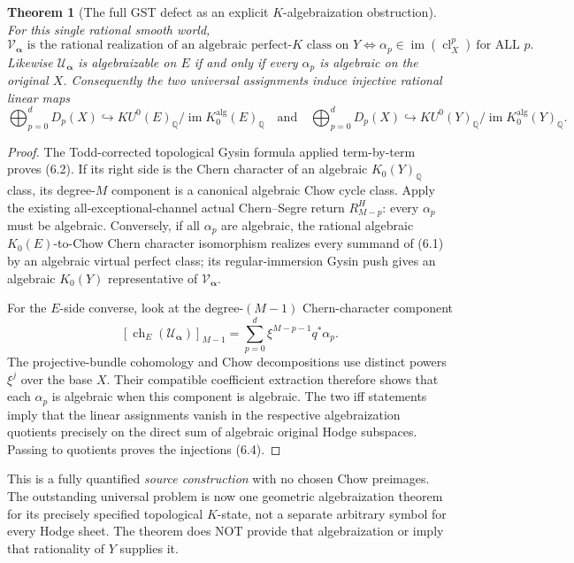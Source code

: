 \documentclass[11pt]{article}
\newcommand{\Q}{\mathbb Q}
\newcommand{\cl}{\operatorname{cl}}
\newcommand{\ch}{\operatorname{ch}}
\newcommand{\im}{\operatorname{im}}
\newtheorem{theorem}{Theorem}[section]
\begin{document}
\begin{theorem}[The full GST defect as an explicit \(K\)-algebraization obstruction]
For this single rational smooth world,
\[
 \boxed{
 \mathcal V_{\boldsymbol\alpha}
 \text{ is the rational realization of an
 algebraic perfect-\(K\) class on }Y
 \iff
 \alpha_p\in\im(\cl_X^p)\ \text{for ALL }p.}
 \tag{6.3}
\]
Likewise \(\mathcal U_{\boldsymbol\alpha}\)
is algebraizable on \(E\) if and only if
every \(\alpha_p\) is algebraic on the
original \(X\). Consequently the
two universal assignments induce
\emph{injective rational linear maps}
\[
 \boxed{
 \bigoplus_{p=0}^d D_p(X)
 \hookrightarrow
 KU^0(E)_\Q/\im K_0^{\mathrm{alg}}(E)_\Q
 \quad\text{and}\quad
 \bigoplus_{p=0}^d D_p(X)
 \hookrightarrow
 KU^0(Y)_\Q/\im K_0^{\mathrm{alg}}(Y)_\Q.}
 \tag{6.4}
\]
\end{theorem}
\begin{proof}
The Todd-corrected topological Gysin
formula applied term-by-term proves
(6.2). If its right side is the
Chern character of an algebraic
\(K_0(Y)_\Q\) class, its degree-\(M\)
component is a canonical algebraic
Chow cycle class. Apply the existing
all-exceptional-channel actual
Chern--Segre return \(R_{M-p}^H\):
every \(\alpha_p\) must be
algebraic. Conversely, if all
\(\alpha_p\) are algebraic,
the rational algebraic
\(K_0(E)\)-to-Chow Chern character
isomorphism realizes every summand
of (6.1) by an algebraic virtual
perfect class; its regular-immersion
Gysin push gives an algebraic
\(K_0(Y)\) representative of
\(\mathcal V_{\boldsymbol\alpha}\).

For the \(E\)-side converse,
look at the degree-\((M-1)\)
Chern-character component
\[
 [\ch_E(\mathcal U_{\boldsymbol\alpha})]_{M-1}
 =\sum_{p=0}^d
  \xi^{M-p-1}q^*\alpha_p.
\]
The projective-bundle
cohomology and Chow decompositions
use distinct powers
\(\xi^j\) over the base \(X\).
Their compatible coefficient
extraction therefore shows that
each \(\alpha_p\) is algebraic
when this component is algebraic.
The two iff statements imply
that the linear assignments
vanish in the respective
algebraization quotients
precisely on the direct sum
of algebraic original Hodge
subspaces. Passing to quotients
proves the injections (6.4).
\end{proof}

This is a fully quantified \emph{source
construction} with no chosen
Chow preimages. The outstanding
universal problem is now one
geometric algebraization theorem
for its precisely specified
topological \(K\)-state, not a
separate arbitrary symbol for
every Hodge sheet. The theorem
does NOT provide that
algebraization or imply that
rationality of \(Y\) supplies it.
\end{document}
